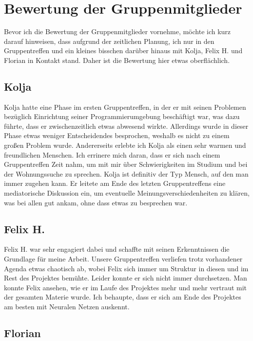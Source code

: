 \documentclass[9pt,a4paper,twocolumn,twoside]{tau-class/tau}
\begin{document}
\section{Bewertung der Gruppenmitglieder}

Bevor ich die Bewertung der Gruppenmitglieder vornehme, möchte ich kurz darauf hinweisen, dass aufgrund der zeitlichen Planung, ich nur in den Gruppentreffen und ein kleines bisschen darüber hinaus
mit Kolja, Felix H. und Florian in Kontakt stand. Daher ist die Bewertung hier etwas oberflächlich.

\subsection{Kolja}

Kolja hatte eine Phase im ersten Gruppentreffen, in der er mit seinen Problemen bezüglich Einrichtung seiner Programmierumgebung
beschäftigt war, was dazu führte, dass er zwischenzeitlich etwas abwesend wirkte. Allerdings wurde in dieser Phase etwas weniger Entscheidendes
besprochen, weshalb es nicht zu einem großen Problem wurde. Andererseits erlebte ich Kolja als einen sehr warmen und freundlichen Menschen. 
Ich errinere mich daran, dass er sich nach einem Gruppentreffen Zeit nahm, um mit mir über Schwierigkeiten im Studium und bei der Wohnungssuche 
zu sprechen. Kolja ist definitiv der Typ Mensch, auf den man immer zugehen kann. Er leitete am Ende des letzten Gruppentreffens eine 
mediatorische Diskussion ein, um eventuelle Meinungsverschiedenheiten zu klären, was bei allen gut ankam, ohne dass etwas zu besprechen war.

\subsection{Felix H.}

Felix H. war sehr engagiert dabei und schaffte mit seinen Erkenntnissen die Grundlage für meine Arbeit. Unsere Gruppentreffen verliefen trotz 
vorhandener Agenda etwas chaotisch ab, wobei Felix sich immer um Struktur in diesen und im Rest des Projektes bemühte. Leider konnte er sich nicht immer durchsetzen.
Man konnte Felix ansehen, wie er im Laufe des Projektes mehr und mehr vertraut mit der gesamten Materie wurde. Ich behaupte, 
dass er sich am Ende des Projektes am besten mit Neuralen Netzen auskennt. 

\subsection{Florian}
\end{document}
